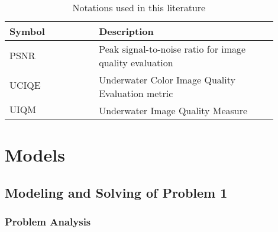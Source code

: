 \documentclass{apmcmthesis}                                             %
\begin{document}
\begin{table}[ht]
\centering
\caption{Notations used in this literature}
\renewcommand{\arraystretch}{1.5} %
\begin{tabular}{>{\centering\arraybackslash}p{0.3\linewidth} >{\centering\arraybackslash}p{0.6\linewidth}} %
\toprule %
\textbf{Symbol} & \textbf{Description} \\ 
\midrule %

$\text{PSNR}$    & Peak signal-to-noise ratio for image quality evaluation \\

$\text{UCIQE}$   & Underwater Color Image Quality Evaluation metric \\

$\text{UIQM}$    & Underwater Image Quality Measure \\


\bottomrule %
\end{tabular}
\label{table:notations}
\end{table}













\newpage
\section{Models}
\subsection{Modeling and Solving of Problem 1}
\subsubsection{Problem Analysis}
\end{document}
